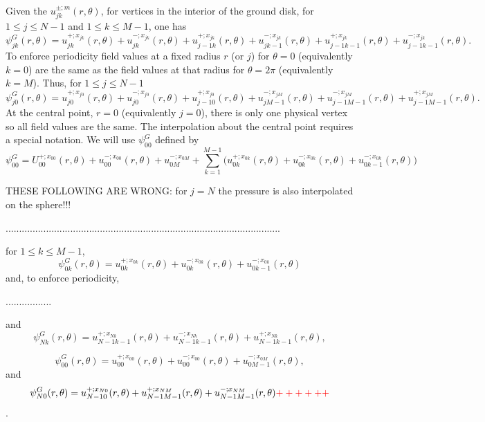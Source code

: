 Given the $u_{jk}^{\pm;m}(r,\theta)$, for vertices in the interior of the ground disk, for $1\le j \le N-1$ and  $1\le k \le M-1$, one has
\[
\psi^{G}_{jk}(r,\theta)
=
u_{jk}^{+;x_{jk}}(r,\theta)+u_{jk}^{-;x_{jk}}(r,\theta)
+
u_{j-1k}^{+;x_{jk}}(r,\theta)+u_{jk-1}^{-;x_{jk}}(r,\theta)
+
u_{j-1k-1}^{+;x_{jk}}(r,\theta)+u_{j-1k-1}^{-;x_{jk}}(r,\theta).
\]
To enforce periodicity field values at a fixed radius $r$ (or $j$) for $\theta=0$ (equivalently $k=0$) are the same as the field values at that radius for $\theta=2\pi$ (equivalently $k=M$). Thus, for $1\le j \le N-1$ 
\[
\psi^{G}_{j0}(r,\theta)
=
u_{j0}^{+;x_{j0}}(r,\theta)+u_{j0}^{-;x_{j0}}(r,\theta)+u_{j-10}^{+;x_{j0}}(r,\theta)
+
u_{jM-1}^{-;x_{jM}}(r,\theta)+u_{j-1M-1}^{-;x_{jM}}(r,\theta)+u_{j-1M-1}^{+;x_{jM}}(r,\theta).
\]
At the central point, $r=0$ (equivalently $j=0$), there is only one physical vertex so all field values are the same. The interpolation about the central point requires a special notation. We will use $\psi^{G}_{00}$ defined by 
$$
\psi^{G}_{00}=
U_{00}^{+;x_{00}}(r,\theta)+u_{00}^{-;x_{00}}(r,\theta)+u_{0M}^{-;x_{0M}}
+
\sum_{k=1}^{M-1}\Big(u_{0k}^{+;x_{0k}}(r,\theta)+u_{0k}^{-;x_{0k}}(r,\theta)+u_{0k-1}^{-;x_{0k}}(r,\theta)\Big)
$$




\bigskip\bigskip

{\color{red} THESE FOLLOWING ARE WRONG: for $j=N$ the pressure is also interpolated on the sphere!!!}

......................................................................................................


for $1\le k \le M-1$, 
\[
\psi^{G}_{0k}(r,\theta)
=
u_{0k}^{+;x_{0k}}(r,\theta)+u_{0k}^{-;x_{0k}}(r,\theta)+u_{0k-1}^{-;x_{0k}}(r,\theta)
\]
and, to enforce periodicity, 

.................


and  
\[
\psi^{G}_{Nk}(r,\theta)
=
u_{N-1k-1}^{+;x_{Nk}}(r,\theta)+u_{N-1k-1}^{-;x_{Nk}}(r,\theta)+u_{N-1k-1}^{+;x_{Nk}}(r,\theta),
\]




\[
\psi^{G}_{00}(r,\theta)
=
u_{00}^{+;x_{00}}(r,\theta)+u_{00}^{-;x_{00}}(r,\theta)+u_{0M-1}^{-;x_{0M}}(r,\theta),
\]
and
\[
\psi^{G}_{N0}(r,\theta)
=
u_{N-10}^{+;x_{N0}}(r,\theta)+u_{N-1M-1}^{+;x_{NM}}(r,\theta)+u_{N-1M-1}^{-;x_{NM}}(r,\theta){\color{red} ++++++}
\]
{\color{red} }.

\vspace*{10pt}

